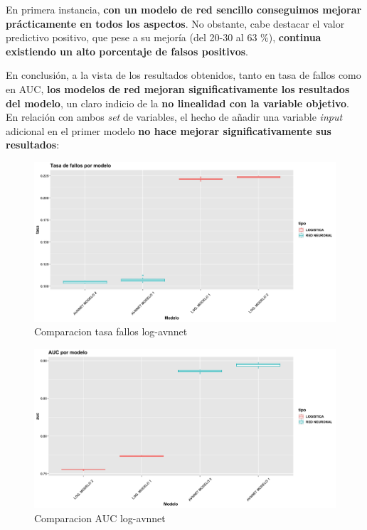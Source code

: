 \documentclass[
]{article}
\begin{document}
En primera instancia, \textbf{con un modelo de red sencillo conseguimos
mejorar prácticamente en todos los aspectos}. No obstante, cabe destacar
el valor predictivo positivo, que pese a su mejoría (del 20-30 al 63
\%), \textbf{continua existiendo un alto porcentaje de falsos
positivos}.

En conclusión, a la vista de los resultados obtenidos, tanto en tasa de
fallos como en AUC, \textbf{los modelos de red mejoran
significativamente los resultados del modelo}, un claro indicio de la
\textbf{no linealidad con la variable objetivo}. En relación con ambos
\emph{set} de variables, el hecho de añadir una variable \emph{input}
adicional en el primer modelo \textbf{no hace mejorar significativamente
sus resultados}:

\begin{figure}[h!]

{\centering \includegraphics[width=0.99\linewidth,height=0.99\textheight,]{./charts/comparativas/02_log_avnnet_tasa} 

}

\caption{Comparacion tasa fallos log-avnnet}\label{fig:unnamed-chunk-62}
\end{figure}
\begin{figure}[h!]

{\centering \includegraphics[width=0.99\linewidth,height=0.99\textheight,]{./charts/comparativas/02_log_avnnet_auc} 

}

\caption{Comparacion AUC log-avnnet}\label{fig:unnamed-chunk-63}
\end{figure}
\end{document}
